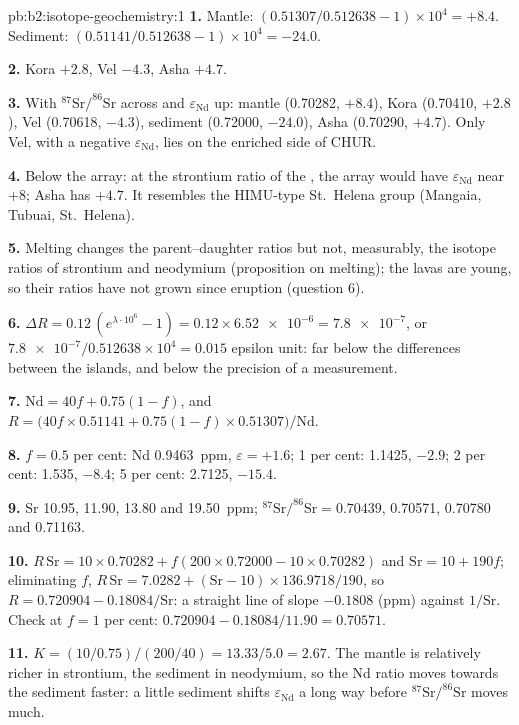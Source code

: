 \begin{solution}{pb:b2:isotope-geochemistry:1}
\textbf{1.} Mantle: $(0.51307/0.512638 - 1)\times10^4 = +8.4$. Sediment:
$(0.51141/0.512638 - 1)\times10^4 = -24.0$.

\textbf{2.} Kora $+2.8$, Vel $-4.3$, Asha $+4.7$.

\textbf{3.} With $^{87}\mathrm{Sr}/^{86}\mathrm{Sr}$ across and $\varepsilon_{\mathrm{Nd}}$ up:
mantle (0.70282, $+8.4$), Kora (0.70410, $+2.8$), Vel (0.70618, $-4.3$), sediment
(0.72000, $-24.0$), Asha (0.70290, $+4.7$). Only Vel, with a negative
$\varepsilon_{\mathrm{Nd}}$, lies on the enriched side of CHUR.

\textbf{4.} Below the array: at the strontium ratio of the , the array
would have $\varepsilon_{\mathrm{Nd}}$ near $+8$; Asha has $+4.7$. It resembles the
HIMU-type St.~Helena group (Mangaia, Tubuai, St.~Helena).

\textbf{5.} Melting changes the parent--daughter ratios but not, measurably, the
isotope ratios of strontium and neodymium (proposition on melting); the lavas are
young, so their ratios have not grown since eruption (question 6).

\textbf{6.} $\Delta R = 0.12\,(e^{\lambda\cdot10^6} - 1) = 0.12\times\num{6.52e-6} =
\num{7.8e-7}$, or $\num{7.8e-7}/0.512638\times10^4 = 0.015$ epsilon unit: far below the
differences between the islands, and below the precision of a measurement.

\textbf{7.} $\mathrm{Nd} = 40f + 0.75(1-f)$, and
$R = \bigl(40f\times0.51141 + 0.75(1-f)\times0.51307\bigr)/\mathrm{Nd}$.

\textbf{8.} $f = 0.5$ per cent: Nd \qty{0.9463}{ppm}, $\varepsilon = +1.6$; 1 per cent:
1.1425, $-2.9$; 2 per cent: 1.535, $-8.4$; 5 per cent: 2.7125, $-15.4$.

\textbf{9.} Sr 10.95, 11.90, 13.80 and \qty{19.50}{ppm}; $^{87}\mathrm{Sr}/^{86}\mathrm{Sr} =
0.70439$, 0.70571, 0.70780 and 0.71163.

\textbf{10.} $R\,\mathrm{Sr} = 10\times0.70282 + f(200\times0.72000 - 10\times0.70282)$ and
$\mathrm{Sr} = 10 + 190f$; eliminating $f$, $R\,\mathrm{Sr} = 7.0282 +
(\mathrm{Sr}-10)\times136.9718/190$, so $R = 0.720904 - 0.18084/\mathrm{Sr}$: a straight
line of slope $-0.1808$ (ppm) against $1/\mathrm{Sr}$. Check at $f = 1$ per cent:
$0.720904 - 0.18084/11.90 = 0.70571$.

\textbf{11.} $K = (10/0.75)/(200/40) = 13.33/5.0 = 2.67$. The mantle is relatively
richer in strontium, the sediment in neodymium, so the Nd ratio moves towards the
sediment faster: a little sediment shifts $\varepsilon_{\mathrm{Nd}}$ a long way before
$^{87}\mathrm{Sr}/^{86}\mathrm{Sr}$ moves much.


\end{solution}
